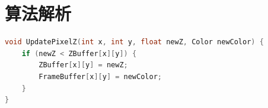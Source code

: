 \documentclass[UTF8]{ctexart}
\begin{document}
\section{算法解析}
\begin{lstlisting}[language=C++]
void UpdatePixelZ(int x, int y, float newZ, Color newColor) {
    if (newZ < ZBuffer[x][y]) {
        ZBuffer[x][y] = newZ;
        FrameBuffer[x][y] = newColor;
    }
}
\end{lstlisting}
\end{document}
